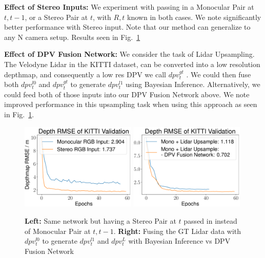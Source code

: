 \textbf{Effect of Stereo Inputs:} We experiment with passing in a Monocular Pair at $t, t-1$, or a Stereo Pair at $t$, with $R,t$ known in both cases. We note significantly better performance with Stereo input. Note that our method can generalize to any N camera setup. Results seen in Fig.~\ref{fig:stereodpv}

\textbf{Effect of DPV Fusion Network:} We consider the task of Lidar Upsampling. The Velodyne Lidar in the KITTI dataset, can be converted into a low resolution depthmap, and consequently a low res DPV we call $dpv_{t}^{gt}$ . We could then fuse both $dpv_{t}^{l0}$ and $dpv_{t}^{gt}$ to generate $dpv_{t}^{l1}$ using Bayesian Inference. Alternatively, we could feed both of those inputs into our DPV Fusion Network above. We note improved performance in this upsampling task when using this approach as seen in Fig.~\ref{fig:stereodpv}. 

\begin{figure}[H]
  \centering
  \begin{minipage}{0.5\textwidth}
      \centering
      \includegraphics[width=0.49\textwidth]{figures/Figure_6.pdf}
      \includegraphics[width=0.49\textwidth]{figures/Figure_7.pdf}
  \end{minipage}\hfill
  \centering
  \caption{ \textbf{Left:} Same network but having a Stereo Pair at $t$ passed in instead of Monocular Pair at $t, t-1$. \textbf{Right:} Fusing the GT Lidar data with $dpv_{t}^{l0}$ to generate $dpv_{t}^{l1}$ and $dpv_{t}^{L}$ with Bayesian Inference vs DPV Fusion Network}
  \label{fig:stereodpv} 
\end{figure}


